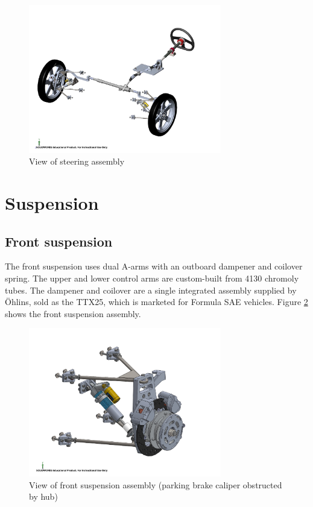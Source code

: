 \documentclass[10pt]{article}
\begin{document}
\begin{figure}
\centering
\includegraphics[width=0.75\textwidth]{figures/steering-assembly}
\caption{View of steering assembly}
\label{fig:steering-assembly}
\end{figure}

\section{Suspension}
\subsection{Front suspension}
The front suspension uses dual A-arms with an outboard dampener and coilover spring. The upper and lower control arms are custom-built from 4130 chromoly tubes. The dampener and coilover are a single integrated assembly supplied by \"Ohlins, sold as the TTX25, which is marketed for Formula SAE vehicles. Figure \ref{fig:front-suspension} shows the front suspension assembly.

\begin{figure}
\centering
\includegraphics[width=0.75\textwidth]{figures/front-suspension}
\caption{View of front suspension assembly (parking brake caliper obstructed by hub)}
\label{fig:front-suspension}
\end{figure}
\end{document}
